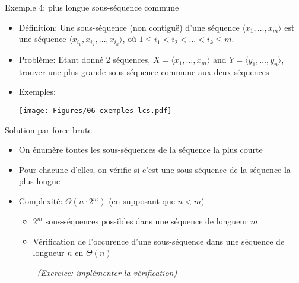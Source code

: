 \begin{frame}{Exemple 4: plus longue sous-séquence commune}

\begin{itemize}
\item Définition: Une \alert{sous-séquence} (non contiguë) d'une séquence $\langle x_1,\ldots,x_m\rangle$ est une séquence $\langle x_{i_1}, x_{i_2}, \ldots, x_{i_k}\rangle$, où $1\leq i_1 < i_2 < \ldots <i_k\leq m$.
\item Problème: Etant donné 2 séquences, $X=\langle
  x_1,\ldots,x_m\rangle$ and $Y=\langle y_1,\ldots,y_n\rangle$, trouver une plus grande sous-séquence commune aux deux séquences
\item Exemples:
\centerline{\texttt{[image: Figures/06-exemples-lcs.pdf]}}
\end{itemize}
\end{frame}

\begin{frame}{Solution par force brute}

\begin{itemize}
\item On énumère toutes les sous-séquences de la séquence la plus courte
\item Pour chacune d'elles, on vérifie si c'est une sous-séquence de la séquence la plus longue

\bigskip

\item Complexité: $\Theta(n\cdot 2^m)$ (en supposant que $n<m$)
\begin{itemize}
\item $2^m$ sous-séquences possibles dans une séquence de longueur $m$
\item Vérification de l'occurence d'une sous-séquence dans une
  séquence de longueur $n$ en $\Theta(n)$

\bigskip
~\hfill{\it (Exercice:
    implémenter la vérification)}
\end{itemize}
\end{itemize}

\end{frame}

